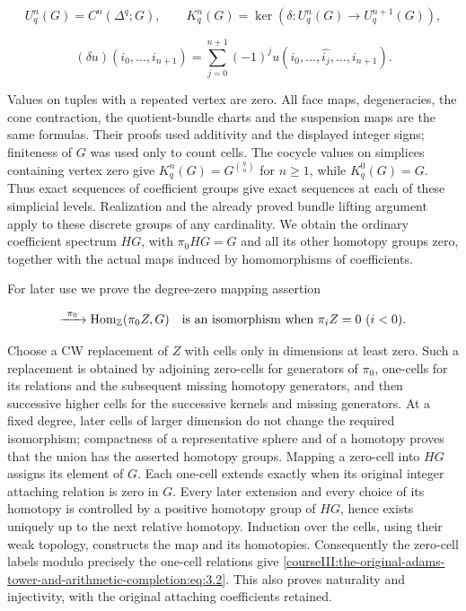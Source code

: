 \[
U^n_q(G)=C^n(\Delta^q;G),\qquad
K^n_q(G)=\ker(\delta:U^n_q(G)\to U^{n+1}_q(G)),
\]

\begin{equation}
(\delta u)(i_0,\ldots,i_{n+1})=
\sum_{j=0}^{n+1}(-1)^j u(i_0,\ldots,\widehat{i_j},\ldots,i_{n+1}).
\label{courseIII:the-original-adams-tower-and-arithmetic-completion:eq:3.1}
\end{equation}

Values on tuples with a repeated vertex are zero. All face maps, degeneracies, the cone contraction, the quotient-bundle charts and the suspension maps are the same formulas. Their proofs used additivity and the displayed integer signs; finiteness of \(G\) was used only to count cells. The cocycle values on simplices containing vertex zero give
\(K^n_q(G)=G^{\binom qn}\) for \(n\geq1\), while \(K^0_q(G)=G\). Thus exact sequences of coefficient groups give exact sequences at each of these simplicial levels. Realization and the already proved bundle lifting argument apply to these discrete groups of any cardinality. We obtain the ordinary coefficient spectrum \(HG\), with \(\pi_0HG=G\) and all its other homotopy groups zero, together with the actual maps induced by homomorphisms of coefficients.

For later use we prove the degree-zero mapping assertion

\begin{equation}
[Z,HG]\xrightarrow{\ \pi_0\ }\operatorname{Hom}_{\mathbb Z}(\pi_0Z,G)
\quad\hbox{is an isomorphism when }\pi_iZ=0\ (i<0).
\label{courseIII:the-original-adams-tower-and-arithmetic-completion:eq:3.2}
\end{equation}

Choose a CW replacement of \(Z\) with cells only in dimensions at least zero. Such a replacement is obtained by adjoining zero-cells for generators of \(\pi_0\), one-cells for its relations and the subsequent missing homotopy generators, and then successive higher cells for the successive kernels and missing generators. At a fixed degree, later cells of larger dimension do not change the required isomorphism; compactness of a representative sphere and of a homotopy proves that the union has the asserted homotopy groups. Mapping a zero-cell into \(HG\) assigns its element of \(G\). Each one-cell extends exactly when its original integer attaching relation is zero in \(G\). Every later extension and every choice of its homotopy is controlled by a positive homotopy group of \(HG\), hence exists uniquely up to the next relative homotopy. Induction over the cells, using their weak topology, constructs the map and its homotopies. Consequently the zero-cell labels modulo precisely the one-cell relations give \eqref{courseIII:the-original-adams-tower-and-arithmetic-completion:eq:3.2}. This also proves naturality and injectivity, with the original attaching coefficients retained.

